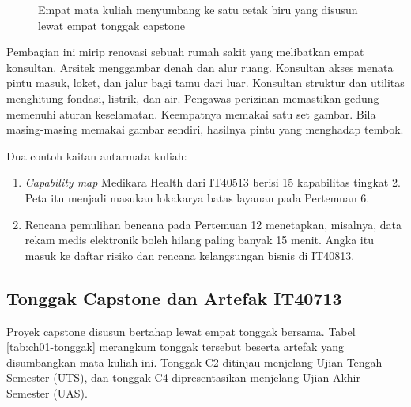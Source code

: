 \begin{figure}[!htb]
  \centering
  
  \caption{Empat mata kuliah menyumbang ke satu cetak biru yang disusun lewat empat
           tonggak capstone}
  \label{fig:ch01-capstone}
\end{figure}

Pembagian ini mirip renovasi sebuah rumah sakit yang melibatkan empat konsultan.
Arsitek menggambar denah dan alur ruang. Konsultan akses menata pintu masuk, loket, dan
jalur bagi tamu dari luar. Konsultan struktur dan utilitas menghitung fondasi, listrik,
dan air. Pengawas perizinan memastikan gedung memenuhi aturan keselamatan. Keempatnya
memakai satu set gambar. Bila masing-masing memakai gambar sendiri, hasilnya pintu yang
menghadap tembok.

Dua contoh kaitan antarmata kuliah:
\begin{enumerate}
  \item \textit{Capability map} Medikara Health dari IT40513 berisi 15 kapabilitas tingkat 2.
        Peta itu menjadi masukan lokakarya batas layanan pada Pertemuan 6.
  \item Rencana pemulihan bencana pada Pertemuan 12 menetapkan, misalnya, data rekam
        medis elektronik boleh hilang paling banyak 15 menit. Angka itu masuk ke daftar
        risiko dan rencana kelangsungan bisnis di IT40813.
\end{enumerate}

\subsection{Tonggak Capstone dan Artefak IT40713}

Proyek capstone disusun bertahap lewat empat tonggak bersama. Tabel
\ref{tab:ch01-tonggak} merangkum tonggak tersebut beserta artefak yang disumbangkan
mata kuliah ini. Tonggak C2 ditinjau menjelang Ujian Tengah Semester (UTS), dan tonggak
C4 dipresentasikan menjelang Ujian Akhir Semester (UAS).

